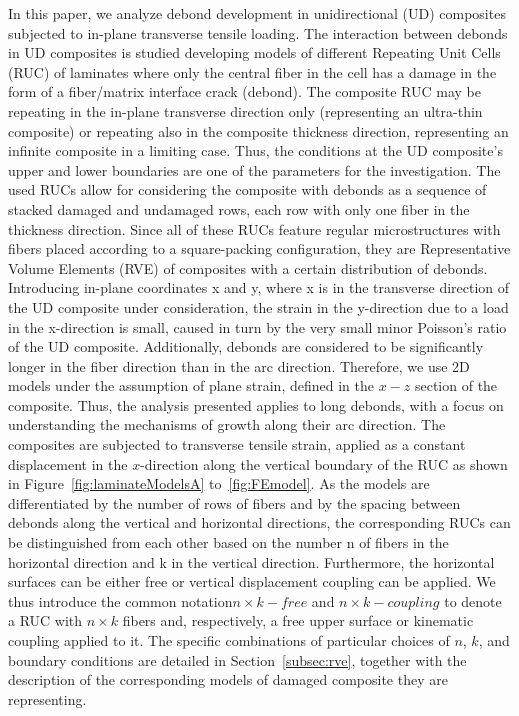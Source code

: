 \documentclass[review]{elsarticle}
\begin{document}
In this paper, we analyze debond development in unidirectional (UD) composites subjected to in-plane transverse tensile loading.  The interaction between debonds in UD composites is studied developing models of different Repeating Unit Cells (RUC) of laminates where only the central fiber in the cell has a damage in the form of a fiber/matrix interface crack (debond). The composite RUC may be repeating in the in-plane transverse direction only (representing an ultra-thin composite) or repeating also in the composite thickness direction, representing an infinite composite in a limiting case. Thus, the conditions at the UD composite's upper and lower boundaries are one of the parameters for the investigation.  The used RUCs allow for considering the composite with debonds as a sequence of stacked damaged and undamaged rows, each row with only one fiber in the thickness direction. Since all of these RUCs feature regular microstructures with fibers placed according to a square-packing configuration, they are Representative Volume Elements (RVE) of composites with a certain distribution of debonds. Introducing in-plane coordinates x and y, where x is in the transverse direction of the UD composite under consideration, the strain in the y-direction due to a load in the x-direction is small, caused in turn by the very small minor Poisson's ratio of the UD composite. Additionally, debonds are considered to be significantly longer in the fiber direction than in the arc direction. Therefore, we use 2D models under the assumption of plane strain, defined in the $x-z$ section of the composite.  Thus, the analysis presented applies to long debonds, with a focus on understanding the mechanisms of growth along their arc direction. The composites are subjected to transverse tensile strain, applied as a constant displacement in the $x$-direction along the vertical boundary of the RUC as shown in  Figure~\ref{fig:laminateModelsA} to~\ref{fig:FEmodel}. As the models are differentiated by the number of rows of fibers and by the spacing between debonds along the vertical and horizontal directions, the corresponding RUCs can be distinguished from each other based on the number n of fibers in the horizontal direction and k in the vertical direction. Furthermore, the horizontal surfaces can be either free or vertical displacement coupling can be applied. We thus introduce the common notation$n\times k-free$  and $n\times k-coupling$ to denote a RUC with $n\times k$ fibers and, respectively, a free upper surface or kinematic coupling applied to it. The specific combinations of particular choices of $n$, $k$, and boundary conditions are detailed in Section~\ref{subsec:rve}, together with the description of the corresponding models of damaged composite they are representing.
\end{document}
